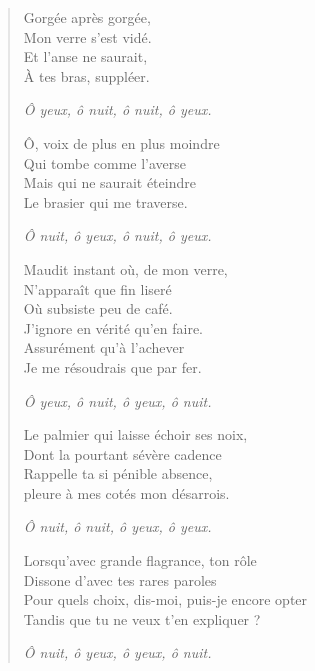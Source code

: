 \begin{verse}%
  \monostique\quatrain%
  Gorgée après gorgée,\\  %
  Mon verre s’est vidé.\\  %
  Et l’anse ne saurait,\\  %
  À tes bras, suppléer.

  \emph{Ô yeux, ô nuit, ô nuit, ô yeux.}

  Ô, voix de plus en plus moindre\\  %
  Qui tombe comme l’averse\\  %
  Mais qui ne saurait éteindre\\  %
  Le brasier qui me traverse.

  \emph{Ô nuit, ô yeux, ô nuit, ô yeux.}

  Maudit instant où, de mon verre,\\  %
  N’apparaît que fin liseré\\  %
  Où subsiste peu de café.\\  %
  J’ignore en vérité qu’en faire.\\  %
  Assurément qu’à l’achever\\  %
  Je me résoudrais que par fer.

  \emph{Ô yeux, ô nuit, ô yeux, ô nuit.}

  Le palmier qui laisse échoir ses noix,\\  %
  Dont la pourtant sévère  cadence\\  %
  Rappelle ta si pénible absence,\\  %
  pleure à mes cotés mon désarrois.

  \emph{Ô nuit, ô nuit, ô yeux, ô yeux.}

  Lorsqu’avec grande flagrance, ton rôle\\  %
  Dissone d’avec tes rares paroles\\  %
  Pour quels choix, dis-moi, puis-je encore opter\\  %
  Tandis que tu ne veux t’en expliquer ?

  \emph{Ô nuit, ô yeux, ô yeux, ô nuit.}


\end{verse}

